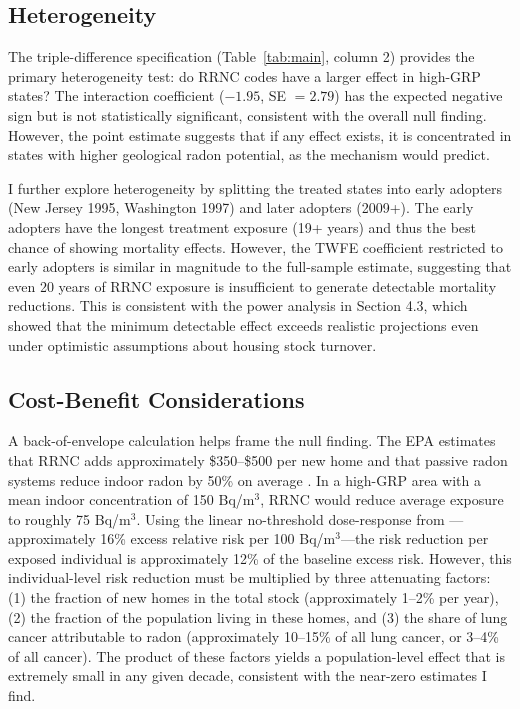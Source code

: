 \documentclass[12pt]{article}
\begin{document}
\subsection{Heterogeneity}

The triple-difference specification (Table~\ref{tab:main}, column 2) provides the primary heterogeneity test: do RRNC codes have a larger effect in high-GRP states? The interaction coefficient ($-1.95$, SE $= 2.79$) has the expected negative sign but is not statistically significant, consistent with the overall null finding. However, the point estimate suggests that if any effect exists, it is concentrated in states with higher geological radon potential, as the mechanism would predict.

I further explore heterogeneity by splitting the treated states into early adopters (New Jersey 1995, Washington 1997) and later adopters (2009+). The early adopters have the longest treatment exposure (19+ years) and thus the best chance of showing mortality effects. However, the TWFE coefficient restricted to early adopters is similar in magnitude to the full-sample estimate, suggesting that even 20 years of RRNC exposure is insufficient to generate detectable mortality reductions. This is consistent with the power analysis in Section 4.3, which showed that the minimum detectable effect exceeds realistic projections even under optimistic assumptions about housing stock turnover.

\subsection{Cost-Benefit Considerations}

A back-of-envelope calculation helps frame the null finding. The EPA estimates that RRNC adds approximately \$350--\$500 per new home and that passive radon systems reduce indoor radon by 50\% on average \citep{epa2001building}. In a high-GRP area with a mean indoor concentration of 150 Bq/m$^3$, RRNC would reduce average exposure to roughly 75 Bq/m$^3$. Using the linear no-threshold dose-response from \citet{darby2005radon}---approximately 16\% excess relative risk per 100 Bq/m$^3$---the risk reduction per exposed individual is approximately 12\% of the baseline excess risk. However, this individual-level risk reduction must be multiplied by three attenuating factors: (1) the fraction of new homes in the total stock (approximately 1--2\% per year), (2) the fraction of the population living in these homes, and (3) the share of lung cancer attributable to radon (approximately 10--15\% of all lung cancer, or 3--4\% of all cancer). The product of these factors yields a population-level effect that is extremely small in any given decade, consistent with the near-zero estimates I find.
\end{document}
